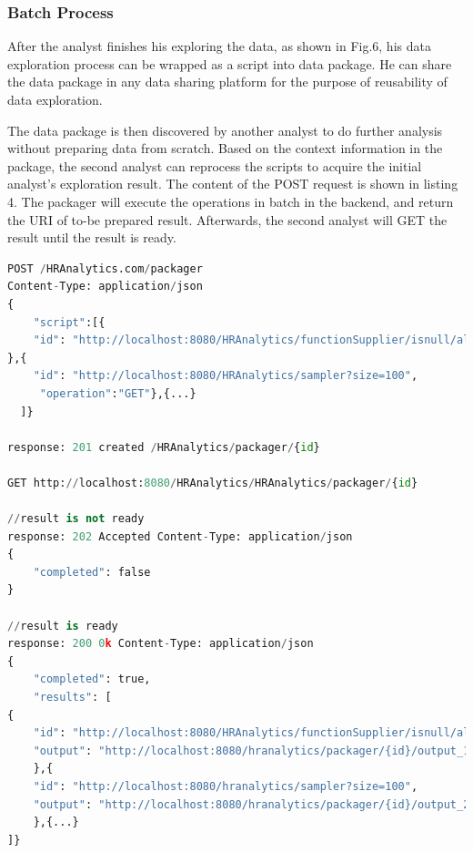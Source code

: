\documentclass[10pt, conference, compsocconf]{IEEEtran}
\begin{document}
\subsubsection{Batch Process}
After the analyst finishes his exploring the data, as shown in Fig.6, his data exploration process can be wrapped as a script into data package. He can share the data package in any data sharing platform for the purpose of reusability of data exploration.

The data package is then discovered by another analyst to do further analysis without preparing data from scratch. Based on the context information in the package, the second analyst can reprocess the scripts to acquire the initial analyst's exploration result. The content of the POST request is shown in listing 4. The packager will execute the operations in batch in the backend, and return the URI of to-be prepared result. Afterwards, the second analyst will GET the result until the result is ready. 
\begin{lstlisting}[language=python, caption=Asynchronous Interaction with Packager]
POST /HRAnalytics.com/packager
Content-Type: application/json
{
	"script":[{
	"id": "http://localhost:8080/HRAnalytics/functionSupplier/isnull/all", "operation":"GET"
},{
	"id": "http://localhost:8080/HRAnalytics/sampler?size=100",
	 "operation":"GET"},{...}
  ]}
  
response: 201 created /HRAnalytics/packager/{id}

GET http://localhost:8080/HRAnalytics/HRAnalytics/packager/{id}

//result is not ready
response: 202 Accepted Content-Type: application/json
{
	"completed": false
}

//result is ready
response: 200 0k Content-Type: application/json
{
	"completed": true,
	"results": [
{
	"id": "http://localhost:8080/HRAnalytics/functionSupplier/isnull/all",
	"output": "http://localhost:8080/hranalytics/packager/{id}/output_1.json"
	},{
	"id": "http://localhost:8080/hranalytics/sampler?size=100",
	"output": "http://localhost:8080/hranalytics/packager/{id}/output_2.json"
	},{...}  
]}
\end{lstlisting}
\end{document}
